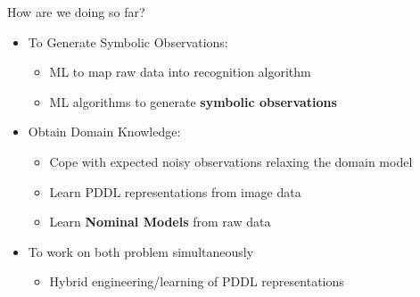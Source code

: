 \documentclass[usenames,dvipsnames]{beamer}
\begin{document}
\begin{frame}[c]{How are we doing so far?}
	\begin{itemize}
		\item To Generate Symbolic Observations:
		\begin{itemize}
			\item ML to map raw data into recognition algorithm {\Large \checkmark}
			\item ML algorithms to generate \textbf{symbolic observations} 
		\end{itemize}
		\item Obtain Domain Knowledge:
		\begin{itemize}
			\item Cope with expected noisy observations relaxing the domain model {\Large \checkmark}
			\item Learn PDDL representations from image data {\Large \checkmark}
			\item Learn \textbf{Nominal Models} from raw data {\Large \color{red} \checkmark}
		\end{itemize}
		\item To work on both problem simultaneously
		\begin{itemize}
			\item Hybrid engineering/learning of PDDL representations 
		\end{itemize}
	\end{itemize}
\end{frame}
\end{document}
